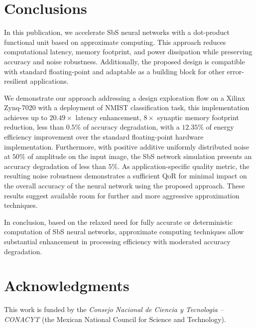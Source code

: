\section{Conclusions}
\label{sec:conclusions}
In this publication, we accelerate SbS neural networks with a dot-product functional unit based on approximate computing. This approach reduces computational latency, memory footprint, and power dissipation while preserving accuracy and noise robustness. Additionally, the proposed design is compatible with standard floating-point and adaptable as a building block for other error-resilient applications.

We demonstrate our approach addressing a design exploration flow on a Xilinx Zynq-7020 with a deployment of NMIST classification task, this implementation achieves up to $20.49\times$ latency enhancement, $8\times$ synaptic memory footprint reduction, less than $0.5\%$ of accuracy degradation, with a $12.35\%$ of energy efficiency improvement over the standard floating-point hardware implementation. Furthermore, with positive additive uniformly distributed noise at $50\%$ of amplitude on the input image, the SbS network simulation presents an accuracy degradation of less than $5\%$. As application-specific quality metric, the resulting noise robustness demonstrates a sufficient QoR for minimal impact on the overall accuracy of the neural network using the proposed approach. These results suggest available room for further and more aggressive approximation techniques.

In conclusion, based on the relaxed need for fully accurate or deterministic computation of SbS neural networks, approximate computing techniques allow substantial enhancement in processing efficiency with moderated accuracy degradation.

\section * {Acknowledgments}\label{sec:Ack}
This work is funded by the \textit{Consejo Nacional de Ciencia y Tecnologia -- CONACYT} (the Mexican National Council for Science and Technology).
